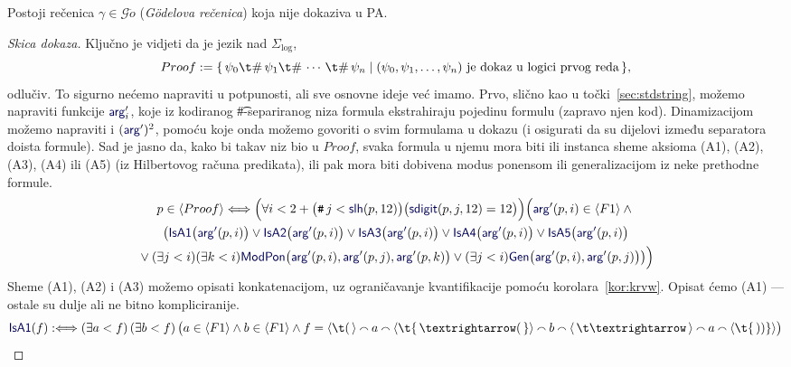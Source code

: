 \begin{teorem}[{name=[Gödelov prvi teorem nepotpunosti]}]\label{tm:goedel}
Postoji rečenica $\gamma\in\mathscr G\ddot o$ (\emph{Gödelova rečenica}) koja nije dokaziva u PA\@.
\end{teorem}
\begin{proof}[Skica dokaza]
Ključno je vidjeti da je jezik nad $\Sigma_{\log}$,
\begin{equation}
    Proof:=\{\,\psi_0\t\#\,\psi_1\t\#\,\dotsb\,\t\#\,\psi_n\mid (\psi_0,\psi_1,\dots,\psi_n)\text{ je dokaz u logici prvog reda}\,\}\text,
\end{equation}
odlučiv\!. To sigurno nećemo napraviti u potpunosti, ali sve osnovne ideje već imamo. Prvo, slično kao u točki~\ref{sec:stdstring}, možemo napraviti funkcije $\f{arg}'_i$, koje iz kodiranog \t\#-separiranog niza formula ekstrahiraju pojedinu formulu (zapravo njen kod). Dinamizacijom možemo napraviti i $(\f{arg}')^2$, pomoću koje onda možemo govoriti o svim formulama u dokazu (i osigurati da su dijelovi između separatora doista formule). Sad je jasno da, kako bi takav niz bio u $Proof$, svaka formula u njemu mora biti ili instanca sheme aksioma (A1), (A2), (A3), (A4) ili (A5) (iz Hilbertovog računa predikata), ili pak mora biti dobivena modus ponensom ili generalizacijom iz neke prethodne formule.
\begin{multline*}
    p\in\langle Proof\rangle\Longleftrightarrow\Bigl(\forall i<2+\bigl(\num j<\f{slh}(p,12)\bigr)\bigl(\f{sdigit}(p,j,12)=12\bigr)\Bigr)\Bigl(\f{arg}'(p,i)\in\kr{F1}\land{}\\
    \bigl(\f{IsA1}\bigl(\f{arg'}(p,i)\bigr)\lor\f{IsA2}\bigl(\f{arg'}(p,i)\bigr)\lor\f{IsA3}\bigl(\f{arg'}(p,i)\bigr)\lor\f{IsA4}\bigl(\f{arg'}(p,i)\bigr)\lor\f{IsA5}\bigl(\f{arg'}(p,i)\bigr)\\
    {}\lor(\exists j<i)(\exists k<i)\f{ModPon}\bigl(\f{arg}'(p,i),\f{arg}'(p,j),\f{arg}'(p,k)\bigr)\lor(\exists j<i)\f{Gen}\bigl(\f{arg}'(p,i),\f{arg}'(p,j)\bigr)\bigr)\Bigr)
\end{multline*}
    Sheme (A1), (A2) i (A3) možemo opisati konkatenacijom, uz ograničavanje kvantifikacije pomoću korolara~\ref{kor:krvw}. Opisat ćemo (A1) --- ostale su dulje ali ne bitno kompliciranije.
\begin{equation*}
    \f{IsA1}(f):\Longleftrightarrow(\exists a<f)\,(\exists b<f)\,\bigl(a\in\kr{F1}\land b\in\kr{F1}\land f=\langle\t(\,\rangle\conc{}a\conc{}\langle\t{\,\textrightarrow(\,}\rangle\conc{}b\conc{}\langle\,\t\textrightarrow\,\rangle\conc{}a\conc{}\langle\t{\,))}\rangle\bigr)
\end{equation*}


\end{proof}
